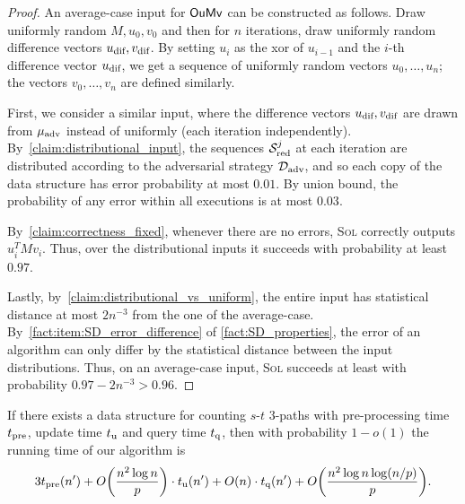\documentclass[letter,11pt]{article}
\newcommand{\oumv}{\textnormal{\textsf{OuMv}}\xspace}
\newcommand{\paths}[3]{${#1}$-${#2}$ ${#3}$-paths\xspace}
\newcommand{\sol}{\textsc{Sol}\xspace}
\newcommand{\tp}{t_{\textnormal{pre}}}
\newcommand{\tu}{t_{\textnormal{u}}}
\newcommand{\tq}{t_{\textnormal{q}}}
\newcommand{\advdist}{\mathcal{D}_\textnormal{adv}}
\newcommand{\muadv}{\mu_\textnormal{adv}}
\newcommand{\redseq}{\mathcal{S}_\textnormal{red}}
\newcommand{\udif}{{u_\textnormal{dif}}}
\newcommand{\vdif}{v_\textnormal{dif}}
\begin{document}
\begin{proof}
    An average-case input for $\oumv$ can be constructed as follows.
    Draw uniformly random $M, u_0, v_0$ and then for $n$ iterations, draw uniformly random difference vectors $\udif, \vdif$.
    By setting $u_i$ as the xor of $u_{i-1}$ and the $i$-th difference vector $\udif$, we get a sequence of uniformly random vectors $u_0,\ldots,u_n$;
    the vectors $v_0,\ldots,v_n$ are defined similarly.
    
    First, we consider a similar input, where the difference vectors $\udif,\vdif$ are drawn from $\muadv$ instead of uniformly (each iteration independently).    
    By~\cref{claim:distributional_input}, the sequences $\redseq^j$ at each iteration are distributed according to the adversarial strategy $\advdist$, 
    and so each copy of the data structure has error probability at most $0.01$.
    By union bound, the probability of any error within all executions is at most $0.03$. 
    
    By~\cref{claim:correctness_fixed}, whenever there are no errors, \sol  correctly outputs $u_i^T M v_i$. Thus, over the distributional inputs it succeeds with probability at least $0.97$.
    
    Lastly, by~\cref{claim:distributional_vs_uniform}, the entire input has statistical distance at most $2n^{-3}$ from the one of the average-case. 
    By~\cref{fact:item:SD_error_difference} of \cref{fact:SD_properties}, the error of an algorithm can only differ by the statistical distance between the input distributions.
    Thus, on an average-case input, \sol succeeds at least with probability $0.97 - 2n^{-3} > 0.96$.
\end{proof}


\begin{claim}
    \label{claim:running_time}
    If there exists a data structure for counting \paths{s}{t}{3} with pre-processing time $\tp$, update time $\tu$ and query time $\tq$, then with probability $1-o(1)$ the running time of our algorithm is
    \[
        3\tp(n') + O\left(\frac{n^2 \log n}{p}\right) \cdot \tu(n') + O(n) \cdot \tq(n') + O\left(\frac{n^2 \log n \log(n/p)}{p}\right) .
    \]
\end{claim}
\end{document}
